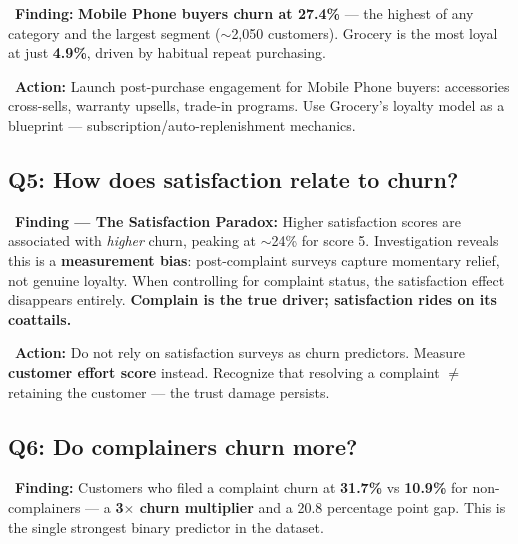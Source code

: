 \documentclass[11pt,a4paper]{article}
\begin{document}
\begin{findingbox}
\faSearch\ \textbf{Finding:} \textbf{Mobile Phone buyers churn at 27.4\%} --- the highest of any category and the largest segment ($\sim$2,050 customers). Grocery is the most loyal at just \textbf{4.9\%}, driven by habitual repeat purchasing.
\end{findingbox}

\begin{actionbox}
\faArrowRight\ \textbf{Action:} Launch post-purchase engagement for Mobile Phone buyers: accessories cross-sells, warranty upsells, trade-in programs. Use Grocery's loyalty model as a blueprint --- subscription/auto-replenishment mechanics.
\end{actionbox}

\subsection{Q5: How does satisfaction relate to churn?}

\begin{findingbox}
\faSearch\ \textbf{Finding --- The Satisfaction Paradox:} Higher satisfaction scores are associated with \emph{higher} churn, peaking at $\sim$24\% for score 5. Investigation reveals this is a \textbf{measurement bias}: post-complaint surveys capture momentary relief, not genuine loyalty. When controlling for complaint status, the satisfaction effect disappears entirely. \textbf{Complain is the true driver; satisfaction rides on its coattails.}
\end{findingbox}

\begin{actionbox}
\faArrowRight\ \textbf{Action:} Do not rely on satisfaction surveys as churn predictors. Measure \textbf{customer effort score} instead. Recognize that resolving a complaint $\neq$ retaining the customer --- the trust damage persists.
\end{actionbox}

\subsection{Q6: Do complainers churn more?}

\begin{findingbox}
\faSearch\ \textbf{Finding:} Customers who filed a complaint churn at \textbf{31.7\%} vs \textbf{10.9\%} for non-complainers --- a \textbf{3$\times$ churn multiplier} and a 20.8 percentage point gap. This is the single strongest binary predictor in the dataset.
\end{findingbox}
\end{document}
